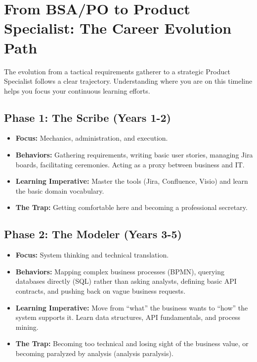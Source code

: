 \bigskip

\section{From BSA/PO to Product Specialist: The Career Evolution
Path}\label{from-bsapo-to-product-specialist-the-career-evolution-path}

The evolution from a tactical requirements gatherer to a strategic
Product Specialist follows a clear trajectory. Understanding where you
are on this timeline helps you focus your continuous learning efforts.

\subsection{Phase 1: The Scribe (Years
1-2)}\label{phase-1-the-scribe-years-1-2}

\begin{itemize}
\tightlist
\item
  \textbf{Focus:} Mechanics, administration, and execution.
\item
  \textbf{Behaviors:} Gathering requirements, writing basic user
  stories, managing Jira boards, facilitating ceremonies. Acting as a
  proxy between business and IT.
\item
  \textbf{Learning Imperative:} Master the tools (Jira, Confluence,
  Visio) and learn the basic domain vocabulary.
\item
  \textbf{The Trap:} Getting comfortable here and becoming a
  professional secretary.
\end{itemize}

\subsection{Phase 2: The Modeler (Years
3-5)}\label{phase-2-the-modeler-years-3-5}

\begin{itemize}
\tightlist
\item
  \textbf{Focus:} System thinking and technical translation.
\item
  \textbf{Behaviors:} Mapping complex business processes (BPMN),
  querying databases directly (SQL) rather than asking analysts,
  defining basic API contracts, and pushing back on vague business
  requests.
\item
  \textbf{Learning Imperative:} Move from ``what'' the business wants to
  ``how'' the system supports it. Learn data structures, API
  fundamentals, and process mining.
\item
  \textbf{The Trap:} Becoming too technical and losing sight of the
  business value, or becoming paralyzed by analysis (analysis
  paralysis).
\end{itemize}

